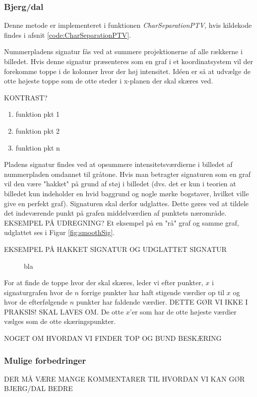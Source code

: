 \subsubsection*{Bjerg/dal}

Denne metode er implementeret i funktionen \textit{CharSeparationPTV}, hvis kildekode findes i afsnit \vref{code:CharSeparationPTV}.


Nummerpladens signatur fås ved at summere projektionerne af alle rækkerne i billedet. Hvis denne signatur præsenteres som en graf i et koordinatsystem vil der forekomme toppe i de kolonner hvor der høj intensitet. Idéen er så at udvælge de otte højeste toppe som de otte steder i x-planen der skal skæres ved.

KONTRAST?

\begin{enumerate}
\item funktion pkt 1
\item funktion pkt 2
\item funktion pkt n
\end{enumerate}

Pladens signatur findes ved at opsummere intensitetsværdierne i billedet af nummerpladen omdannet til gråtone. Hvis man betragter signaturen som en graf vil den være "hakket" på grund af støj i billedet (dvs. det er kun i teorien at billedet kun indeholder en hvid baggrund og nogle mørke bogstaver, hvilket ville give en perfekt graf). Signaturen skal derfor udglattes. Dette gøres ved at tildele det indeværende punkt på grafen middelværdien af punktets nærområde. EKSEMPEL PÅ UDREGNING? Et eksempel på en "rå" graf og samme graf, udglattet ses i Figur \vref{fig:smoothSig}.

EKSEMPEL PÅ HAKKET SIGNATUR OG UDGLATTET SIGNATUR

\begin{figure}[htp]
\label{fig:smoothSig}
\caption{bla}
\end{figure}

For at finde de toppe hvor der skal skæres, leder vi efter punkter, $x$ i signaturgrafen hvor de $n$ forrige punkter har haft stigende værdier op til $x$ og hvor de efterfølgende $n$ punkter har faldende værdier. DETTE GØR VI IKKE I PRAKSIS! SKAL LAVES OM. De otte $x$'er som har de otte højeste værdier vælges som de otte skæringspunkter.

NOGET OM HVORDAN VI FINDER TOP OG BUND BESKÆRING


\subsubsection{Mulige forbedringer}
DER MÅ VÆRE MANGE KOMMENTARER TIL HVORDAN VI KAN GØR BJERG/DAL BEDRE

